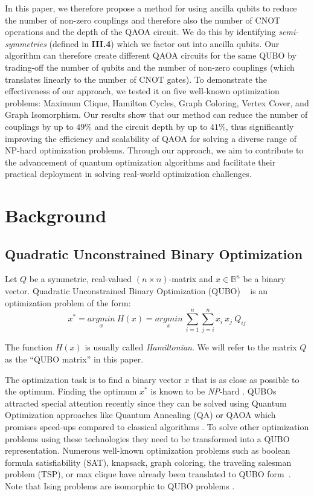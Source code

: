 \documentclass[conference]{IEEEtran}
\theoremstyle{plain}
\theoremstyle{definition}
\theoremstyle{remark}
\begin{document}
In this paper, we therefore propose a method for using ancilla qubits to reduce the number of non-zero couplings and therefore also the number of CNOT operations and the depth of the QAOA circuit. We do this by identifying \textit{semi-symmetries} (defined in \textbf{III.4}) which we factor out into ancilla qubits. Our algorithm can therefore create different QAOA circuits for the same QUBO by trading-off the number of qubits and the number of non-zero couplings (which translates linearly to the number of CNOT gates). To demonstrate the effectiveness of our approach, we tested it on five well-known optimization problems: Maximum Clique, Hamilton Cycles, Graph Coloring, Vertex Cover, and Graph Isomorphism. Our results show that our method can reduce the number of couplings by up to $49\%$ and the circuit depth by up to $41\%$, thus significantly improving the efficiency and scalability of QAOA for solving a diverse range of NP-hard optimization problems. Through our approach, we aim to contribute to the advancement of quantum optimization algorithms and facilitate their practical deployment in solving real-world optimization challenges.

\section{Background}

\subsection{Quadratic Unconstrained Binary Optimization}
Let $Q$ be a symmetric, real-valued $(n \times n)$-matrix and $x \in \mathbb{B}^n$ be a binary vector. Quadratic Unconstrained Binary Optimization (QUBO) ~\cite{10} is an optimization problem of the form:
\begin{equation}
x^* = \underset{x}{argmin} \: H(x) = \underset{x}{argmin} \: \sum_{i=1}^{n}\sum_{j=i}^{n}{x_i\ x_j\ Q_{ij}}
\end{equation}

The function $H(x)$ is usually called \textit{Hamiltonian}.
We will refer to the matrix $Q$ as the ``QUBO matrix'' in this paper.

The optimization task is to find a binary vector $x$ that is as close as possible to the optimum. Finding the optimum $x^*$ is known to be \textit{NP}-hard \cite{glover2018tutorial}. QUBOs attracted special attention recently since they can be solved using Quantum Optimization approaches like Quantum Annealing (QA) \cite{morita2008mathematical} or QAOA \cite{farhi2014quantum} which promises speed-ups compared to classical algorithms \cite{farhi2016quantum}. To solve other optimization problems using these technologies they need to be transformed into a QUBO representation. Numerous well-known optimization problems such as boolean formula satisfiability (SAT), knapsack, graph coloring, the traveling salesman problem (TSP), or max clique have already been translated to QUBO form~\cite{8,12,13,15,lucas2014ising}. Note that Ising problems \cite{cipra1987introduction} are isomorphic to QUBO problems \cite{zick2015experimental}.
\end{document}
